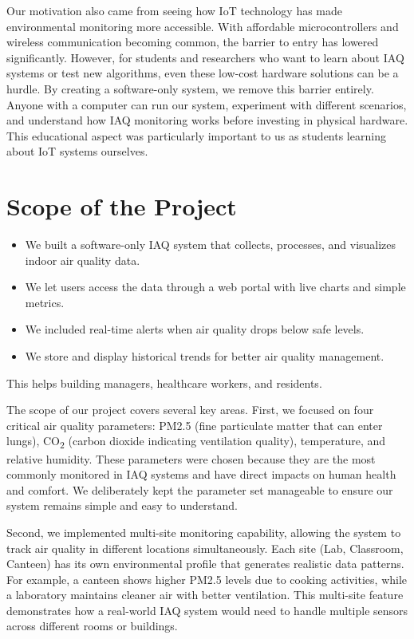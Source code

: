 \documentclass[12pt]{report}
\begin{document}
Our motivation also came from seeing how IoT technology has made environmental monitoring more accessible. With affordable microcontrollers and wireless communication becoming common, the barrier to entry has lowered significantly. However, for students and researchers who want to learn about IAQ systems or test new algorithms, even these low-cost hardware solutions can be a hurdle. By creating a software-only system, we remove this barrier entirely. Anyone with a computer can run our system, experiment with different scenarios, and understand how IAQ monitoring works before investing in physical hardware. This educational aspect was particularly important to us as students learning about IoT systems ourselves.

\section{Scope of the Project}
\begin{itemize}
  \item We built a software-only IAQ system that collects, processes, and visualizes indoor air quality data.
  \item We let users access the data through a web portal with live charts and simple metrics.
  \item We included real-time alerts when air quality drops below safe levels.
  \item We store and display historical trends for better air quality management.
\end{itemize}
This helps building managers, healthcare workers, and residents.

The scope of our project covers several key areas. First, we focused on four critical air quality parameters: PM2.5 (fine particulate matter that can enter lungs), CO\textsubscript{2} (carbon dioxide indicating ventilation quality), temperature, and relative humidity. These parameters were chosen because they are the most commonly monitored in IAQ systems and have direct impacts on human health and comfort. We deliberately kept the parameter set manageable to ensure our system remains simple and easy to understand.

Second, we implemented multi-site monitoring capability, allowing the system to track air quality in different locations simultaneously. Each site (Lab, Classroom, Canteen) has its own environmental profile that generates realistic data patterns. For example, a canteen shows higher PM2.5 levels due to cooking activities, while a laboratory maintains cleaner air with better ventilation. This multi-site feature demonstrates how a real-world IAQ system would need to handle multiple sensors across different rooms or buildings.
\end{document}
